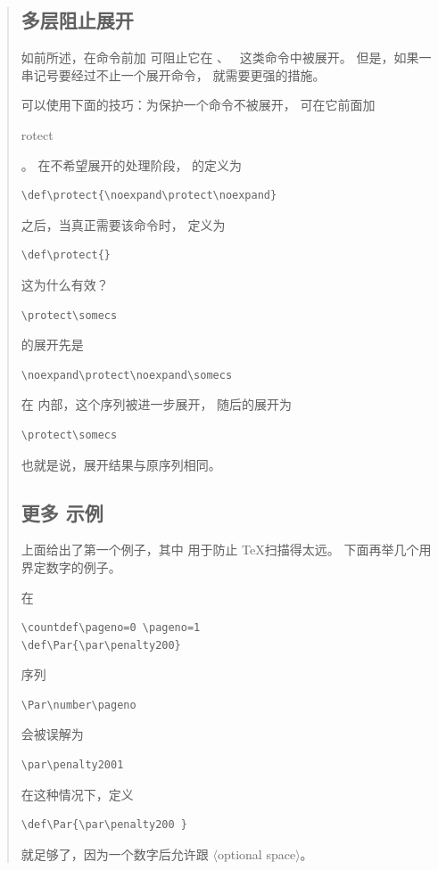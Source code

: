 \documentclass[a4paper]{rapport3}
\makeatletter
\def\gr#1{$\langle$#1$\rangle$}\def\key#1{{\tt#1}}
\newenvironment{disp}{\begin{quotation}}{\end{quotation}}
\def\cstoidx#1\par{\index{#1@\cs{#1}}}
\def\csidx#1{\cstoidx #1\par\cs{#1}}
\makeatother
\begin{document}
\begin{disp}
\subsection{多层阻止展开}

如前所述，在命令前加  可阻止它在
、~ 这类命令中被展开。
但是，如果一串记号要经过不止一个展开命令，
就需要更强的措施。

可以使用下面的技巧：为保护一个命令不被展开，
可在它前面加 \csidx{protect}。
在不希望展开的处理阶段， 的定义为
\begin{verbatim}
\def\protect{\noexpand\protect\noexpand}
\end{verbatim}
之后，当真正需要该命令时， 定义为 
\begin{verbatim}
\def\protect{}
\end{verbatim}

这为什么有效？
\begin{verbatim}
\protect\somecs
\end{verbatim}
的展开先是
\begin{verbatim}
\noexpand\protect\noexpand\somecs
\end{verbatim}
在  内部，这个序列被进一步展开，
随后的展开为
\begin{verbatim}
\protect\somecs
\end{verbatim}
也就是说，展开结果与原序列相同。


\subsection{更多  示例}

上面给出了第一个例子，其中  用于防止 \TeX 扫描得太远。
下面再举几个用  界定数字的例子。

在
\begin{verbatim}
\countdef\pageno=0 \pageno=1
\def\Par{\par\penalty200}
\end{verbatim}
序列 \begin{verbatim}
\Par\number\pageno
\end{verbatim}
会被误解为
\begin{verbatim}
\par\penalty2001
\end{verbatim}
在这种情况下，定义
\begin{verbatim}
\def\Par{\par\penalty200 }
\end{verbatim}
就足够了，因为一个数字后允许跟 \gr{optional space}。


\end{disp}
\end{document}
